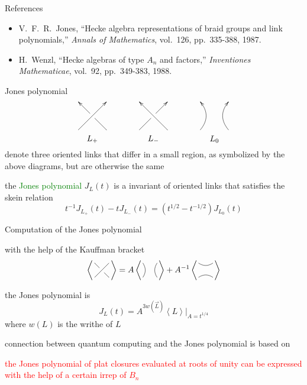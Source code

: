 \documentclass{prosper}
\renewcommand{\>}{\rangle}
\newcommand{\<}{\langle}
\begin{document}
\begin{slide}{References}
\begin{itemize}
\item V.~F.~R.~Jones, ``Hecke algebra representations of braid groups and link polynomials,'' \emph{Annals of Mathematics}, vol.~126, pp.~335-388, 1987.
\item H.~Wenzl, ``Hecke algebras of type $A_n$ and factors,'' \emph{Inventiones Mathematicae}, vol.~92, pp.~349-383, 1988.
\end{itemize}
\end{slide}

\begin{slide}{Jones polynomial}
%
%
\[
\xy
(6,6)*{}="tl";
(-6,6)*{}="tr";
(6,-6)*{}="bl";
(-6,-6)*{}="br";
{\ar|{\hole \; } "bl";"tr"};
{\ar "br";"tl"};
(0,-10)*{L_{+}};
\endxy
\qquad \qquad
\xy
(-6,6)*{}="tl";
(6,6)*{}="tr";
(-6,-6)*{}="bl";
(6,-6)*{}="br";
{\ar|{\hole \; } "bl";"tr"};
{\ar "br";"tl"};
(0,-10)*{L_{-}};
\endxy
\qquad\qquad 
 \xy
(-6,6)*{}="tl";
(6,6)*{}="tr";
(-6,-6)*{}="bl";
(6,-6)*{}="br";
"bl";"tl" **\crv{(-1,0)}?(1)*\dir{>};
"br";"tr" **\crv{(1,0)}?(1)*\dir{>};
(0,-10)*{L_{0}};
\endxy
\]
denote three oriented links that differ in a small region, as
symbolized by the above diagrams, but are otherwise the same

\medskip
the \textcolor{green}{Jones polynomial} $J_L(t)$ is a invariant of
oriented links that satisfies the skein relation
\[
t^{-1} J_{L_{+}}(t) - t J_{L_{-}}(t) = 
(t^{1/2} - t^{-1/2}) J_{L_{0}}(t)
\]


\end{slide}

\begin{slide}{Computation of the Jones polynomial}

with the help of the Kauffman bracket
\[
\left\langle \hspace{-.18in} \rule{0in}{.2in}
\xy
(3,3)*{}="tl";
(-3,3)*{}="tr";
(3,-3)*{}="bl";
(-3,-3)*{}="br";
{\ar@{-}|{\hole \; \hole \; \hole \; \hole \; \hole \; \hole } "bl";"tr"};
{\ar@{-} "br";"tl"};
\endxy \hspace{-.18in}
\right\rangle = A
\left\langle \, \rule{0in}{.2in}
\xy
(-3,3)*{}="tl";
(3,3)*{}="tr";
(-3,-3)*{}="bl";
(3,-3)*{}="br";
"bl";"tl" **\crv{(-1,0)};
"br";"tr" **\crv{(1,0)};
\endxy \,
\right\rangle + A^{-1}
\left\langle\, \rule{0in}{.2in}
\xy
(-3,3)*{}="tl";
(3,3)*{}="tr";
(-3,-3)*{}="bl";
(3,-3)*{}="br";
"tl";"tr" **\crv{(0,1)};
"bl";"br" **\crv{(0,-1)};
\endxy\,
\right\rangle
\]

the Jones polynomial is
\[
J_{L}(t) =  
A^{3w(\overrightarrow{L})}\left\langle L\right\rangle\Big|_{A = t^{1/4}}
\]
where $w(L)$ is the writhe of $L$

\medskip
connection between quantum computing and the Jones polynomial is based on

\medskip
\textcolor{red}{the Jones polynomial of plat closures evaluated at
roots of unity can be expressed with the help of a certain irrep of
$B_n$}

\end{slide}
\end{document}
